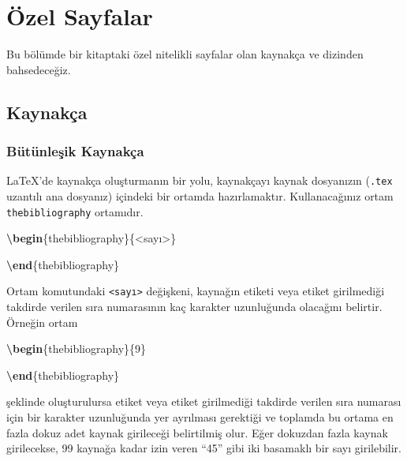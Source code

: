 \documentclass[
  10pt,
]{scrbook}
\newenvironment{Shaded}{\begin{snugshade}}{\end{snugshade}}
\newcommand{\ExtensionTok}[1]{#1}
\newcommand{\KeywordTok}[1]{\textcolor[rgb]{0.13,0.29,0.53}{\textbf{#1}}}
\newcommand{\NormalTok}[1]{#1}
\theoremstyle{definition}
\theoremstyle{definition}
\theoremstyle{definition}
\theoremstyle{definition}
\theoremstyle{remark}
\begin{document}
\hypertarget{uxf6zel-sayfalar}{%
\chapter{Özel Sayfalar}\label{uxf6zel-sayfalar}}

Bu bölümde bir kitaptaki özel nitelikli sayfalar olan kaynakça ve dizinden bahsedeceğiz.

\hypertarget{kaynakuxe7a}{%
\section{Kaynakça}\label{kaynakuxe7a}}

\hypertarget{buxfctuxfcnleux15fik-kaynakuxe7a}{%
\subsection{Bütünleşik Kaynakça}\label{buxfctuxfcnleux15fik-kaynakuxe7a}}

LaTeX'de kaynakça oluşturmanın bir yolu, kaynakçayı kaynak dosyanızın
(\texttt{.tex} uzantılı ana dosyanız) içindeki bir ortamda hazırlamaktır.
Kullanacağınız ortam \texttt{thebibliography} ortamıdır.

\begin{Shaded}
\begin{Highlighting}[]
\KeywordTok{\textbackslash{}begin}\NormalTok{\{}\ExtensionTok{thebibliography}\NormalTok{\}\{\textless{}sayı\textgreater{}\}}

\KeywordTok{\textbackslash{}end}\NormalTok{\{}\ExtensionTok{thebibliography}\NormalTok{\}}
\end{Highlighting}
\end{Shaded}

Ortam komutundaki \texttt{\textless{}sayı\textgreater{}} değişkeni, kaynağın etiketi veya etiket
girilmediği takdirde verilen sıra numarasının kaç karakter uzunluğunda
olacağını belirtir. Örneğin ortam

\begin{Shaded}
\begin{Highlighting}[]
\KeywordTok{\textbackslash{}begin}\NormalTok{\{}\ExtensionTok{thebibliography}\NormalTok{\}\{9\}}
        
\KeywordTok{\textbackslash{}end}\NormalTok{\{}\ExtensionTok{thebibliography}\NormalTok{\}}
\end{Highlighting}
\end{Shaded}

şeklinde oluşturulursa etiket veya etiket girilmediği takdirde verilen
sıra numarası için bir karakter uzunluğunda yer ayrılması gerektiği ve
toplamda bu ortama en fazla dokuz adet kaynak girileceği belirtilmiş
olur. Eğer dokuzdan fazla kaynak girilecekse, 99 kaynağa kadar izin
veren ``45'' gibi iki basamaklı bir sayı girilebilir.
\end{document}
